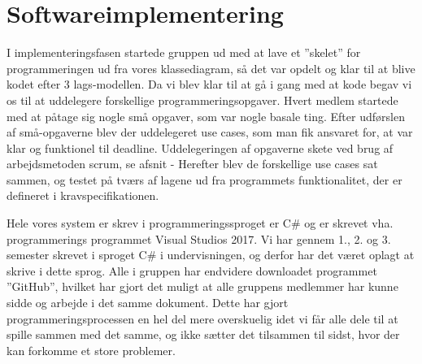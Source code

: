 \section{Softwareimplementering}
I implementeringsfasen startede gruppen ud med at lave et ”skelet” for programmeringen ud fra vores klassediagram, så det var opdelt og klar til at blive kodet efter 3 lags-modellen. Da vi blev klar til at gå i gang med at kode begav vi os til at uddelegere forskellige programmeringsopgaver. Hvert medlem startede med at påtage sig nogle små opgaver, som var nogle basale ting. Efter udførslen af små-opgaverne blev der uddelegeret use cases, som man fik ansvaret for, at var klar og funktionel til deadline. Uddelegeringen af opgaverne skete ved brug af arbejdsmetoden scrum, se afsnit - Herefter blev de forskellige use cases sat sammen, og testet på tværs af lagene ud fra programmets funktionalitet, der er defineret i kravspecifikationen. 

Hele vores system er skrev i programmeringssproget er C\# og er skrevet vha. programmerings programmet Visual Studios 2017.  Vi har gennem 1., 2. og 3. semester skrevet i sproget C\# i undervisningen, og derfor har det været oplagt at skrive i dette sprog. Alle i gruppen har endvidere downloadet programmet ”GitHub”, hvilket har gjort det muligt at alle gruppens medlemmer har kunne sidde og arbejde i det samme dokument. Dette har gjort programmeringsprocessen en hel del mere overskuelig idet vi får alle dele til at spille sammen med det samme, og ikke sætter det tilsammen til sidst, hvor der kan forkomme et store problemer.



